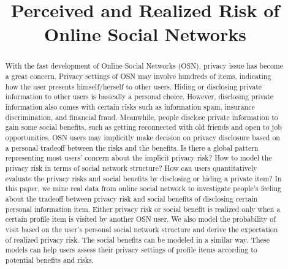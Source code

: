 \documentclass[a4paper]{article}
\begin{document}
\title{Perceived and Realized Risk of Online Social Networks}

\maketitle 

\begin{abstract}
With the fast development of Online Social Networks (OSN), privacy
issue has become a great concern. Privacy settings of OSN may involve
hundreds of items, indicating how the user presents himself/herself to
other users. Hiding or disclosing private information to other users
is basically a personal choice. However, disclosing private
information also comes with certain risks such as information spam,
insurance discrimination, and financial fraud. Meanwhile, people
disclose private information to gain some social benefits, such as
getting reconnected with old friends and open to job
opportunities. OSN users may implicitly make decision on privacy
disclosure based on a personal tradeoff between the risks and the
benefits. Is there a global pattern representing most users’ concern
about the implicit privacy risk? How to model the privacy risk in
terms of social network structure? How can users quantitatively
evaluate the privacy risks and social benefits by disclosing or hiding
a private item? In this paper, we mine real data from online social
network to investigate people’s feeling about the tradeoff between
privacy risk and social benefits of disclosing certain personal
information item. Either privacy risk or social benefit is realized
only when a certain profile item is visited by another OSN user. We
also model the probability of visit based on the user’s personal
social network structure and derive the expectation of realized
privacy risk. The social benefits can be modeled in a similar
way. These models can help users assess their privacy settings of
profile items according to potential benefits and risks.

\end{abstract}

\end{document}
